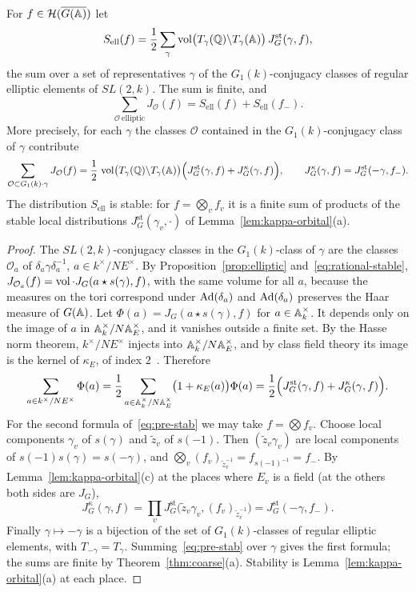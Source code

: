 \begin{theorem}\label{thm:elliptic-stable}
For $f\in\mathcal H(\overline{G(\mathbb{A})})$ let
\[
S_{\mathrm{ell}}(f)=\frac12\sum_{\gamma}\operatorname{vol}\bigl(T_\gamma(\mathbb{Q})
\backslash T_\gamma(\mathbb{A})\bigr)\,J^{\mathrm{st}}_G(\gamma,f),
\]
the sum over a set of representatives $\gamma$ of the $G_1(k)$-conjugacy
classes of regular elliptic elements of $SL(2,k)$. The sum is finite, and
\[
\sum_{\mathcal O\ \mathrm{elliptic}}J_{\mathcal O}(f)=S_{\mathrm{ell}}(f)
+S_{\mathrm{ell}}(f_-).
\]
More precisely, for each $\gamma$ the classes $\mathcal O$ contained in
the $G_1(k)$-conjugacy class of $\gamma$ contribute
\begin{equation}\label{eq:pre-stab}
\sum_{\mathcal O\subset G_1(k)\cdot\gamma}J_{\mathcal O}(f)=\frac12\,
\operatorname{vol}\bigl(T_\gamma(\mathbb{Q})\backslash T_\gamma(\mathbb{A})\bigr)\Bigl(
J^{\mathrm{st}}_G(\gamma,f)+J^{\kappa}_G(\gamma,f)\Bigr),
\qquad J^\kappa_G(\gamma,f)=J^{\mathrm{st}}_G(-\gamma,f_-).
\end{equation}
The distribution $S_{\mathrm{ell}}$ is stable: for $f=\bigotimes_vf_v$ it
is a finite sum of products of the stable local distributions
$J^{\mathrm{st}}_G(\gamma_v,\cdot)$ of Lemma~\ref{lem:kappa-orbital}(a).
\end{theorem}

\begin{proof}
The $SL(2,k)$-conjugacy classes in the $G_1(k)$-class of $\gamma$ are the
classes $\mathcal O_a$ of $\delta_a\gamma\delta_a^{-1}$, $a\in k^\times/
N E^\times$. By Proposition~\ref{prop:elliptic}
and~\eqref{eq:rational-stable}, $J_{\mathcal O_a}(f)=\operatorname{vol}\cdot
J_G(a\star s(\gamma),f)$, with the same volume for all $a$, because the
measures on the tori correspond under $\operatorname{Ad}(\delta_a)$ and $\operatorname{Ad}(\delta_a)$
preserves the Haar measure of $G(\mathbb{A})$. Let
$\Phi(a)=J_G(a\star s(\gamma),f)$ for $a\in\mathbb{A}_k^\times$. It depends only
on the image of $a$ in $\mathbb{A}_k^\times/N\mathbb{A}_E^\times$, and it vanishes outside
a finite set. By the Hasse norm theorem, $k^\times/N E^\times$ injects
into $\mathbb{A}_k^\times/N\mathbb{A}_E^\times$, and by class field theory its image is the
kernel of $\kappa_E$, of index $2$~\cite{CF67}. Therefore
\[
\sum_{a\in k^\times/N E^\times}\Phi(a)=\frac12\sum_{a\in\mathbb{A}_k^\times/N\mathbb{A}_E^\times}
\bigl(1+\kappa_E(a)\bigr)\Phi(a)=\frac12\Bigl(J^{\mathrm{st}}_G(\gamma,f)+
J^\kappa_G(\gamma,f)\Bigr).
\]
For the second formula of~\eqref{eq:pre-stab} we may take
$f=\bigotimes f_v$. Choose local components $\gamma_v$ of $s(\gamma)$ and
$\tilde z_v$ of $s(-1)$. Then $(\tilde z_v\gamma_v)$ are local components
of $s(-1)s(\gamma)=s(-\gamma)$, and $\bigotimes_v(f_v)_{\tilde z_v^{-1}}=
f_{s(-1)^{-1}}=f_-$. By Lemma~\ref{lem:kappa-orbital}(c) at the places
where $E_v$ is a field (at the others both sides are $J_G$),
\[
J^\kappa_G(\gamma,f)=\prod_vJ^{\mathrm{st}}_G\bigl(\tilde z_v\gamma_v,
(f_v)_{\tilde z_v^{-1}}\bigr)=J^{\mathrm{st}}_G(-\gamma,f_-).
\]
Finally $\gamma\mapsto-\gamma$ is a bijection of the set of
$G_1(k)$-classes of regular elliptic elements, with $T_{-\gamma}=
T_\gamma$. Summing~\eqref{eq:pre-stab} over $\gamma$ gives the first
formula; the sums are finite by Theorem~\ref{thm:coarse}(a). Stability is
Lemma~\ref{lem:kappa-orbital}(a) at each place.
\end{proof}


